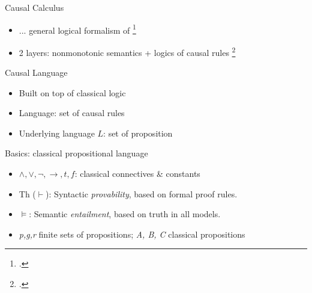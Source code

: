 \documentclass{beamer} %
\begin{document}
\begin{frame}{Causal Calculus} %
    \begin{itemize}
        \item ... general logical formalism of \footcite{bochman_actual_2018}
        \item 2 layers: nonmonotonic semantics + logics of causal rules \footcite{bochman_causal_2004}
    \end{itemize}

    \begin{block}{Causal Language}
        \begin{itemize}
            \item Built on top of classical logic
            \item Language: set of causal rules
            \item Underlying language $L$: set of proposition
        \end{itemize}
    \end{block}
    
    \begin{block}{Basics: classical propositional language \cite[79]{bochman_logical_2021}}
        \begin{itemize}
            \item $\land, \lor, \neg, \to, t, f$: classical connectives \& constants
            \item Th ($\vdash$): Syntactic \textit{provability}, based on formal proof rules.
            \item $\vDash$: Semantic \textit{entailment}, based on truth in all models.
            \item \textit{p,g,r} finite sets of propositions; \textit{A, B, C} classical propositions
        \end{itemize}
    \end{block}
\end{frame}
\end{document}
